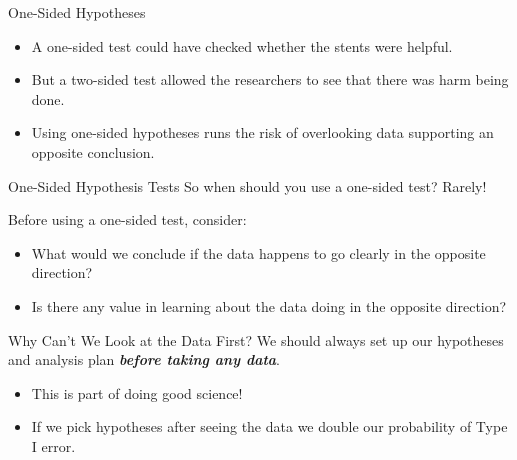 \begin{frame}{One-Sided Hypotheses}
    \begin{itemize}
        \item A one-sided test could have checked whether the stents were helpful.
        \item But a two-sided test allowed the researchers to see that there was harm being done.
        \item Using one-sided hypotheses runs the risk of overlooking data supporting an opposite conclusion.
    \end{itemize}
\end{frame}

\begin{frame}{One-Sided Hypothesis Tests}
    So when should you use a one-sided test? Rarely! 
    
    \vspace{12pt}
    Before using a one-sided test, consider:
    \begin{itemize}
        \item What would we conclude if the data happens to go clearly in the opposite direction?
        \item Is there any value in learning about the data doing in the opposite direction?
    \end{itemize}
\end{frame}

\begin{frame}{Why Can't We Look at the Data First?}
    We should always set up our hypotheses and analysis plan \textit{\textbf{before taking any data}}.
    \begin{itemize}
        \item This is part of doing good science!
        \item If we pick hypotheses after seeing the data we double our probability of Type I error.
    \end{itemize}
\end{frame}
